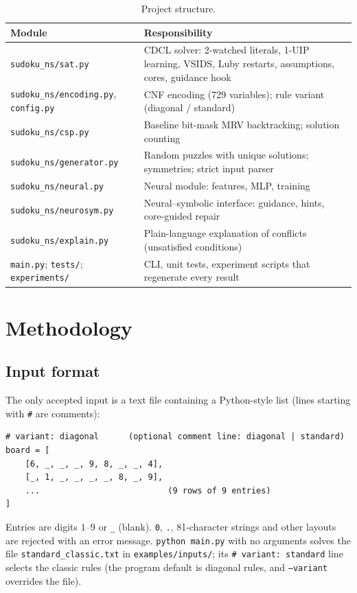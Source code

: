 \documentclass[12pt,a4paper]{article}
\begin{document}
\begin{table}[htbp]\centering\small
\begin{tabular}{@{}L{5.2cm}L{9.5cm}@{}}\toprule
Module & Responsibility\\\midrule
\texttt{sudoku\_ns/sat.py} & CDCL solver: 2-watched literals, 1-UIP learning, VSIDS, Luby restarts, assumptions, cores, guidance hook\\
\texttt{sudoku\_ns/encoding.py}, \texttt{config.py} & CNF encoding (729 variables); rule variant (diagonal / standard)\\
\texttt{sudoku\_ns/csp.py} & Baseline bit-mask MRV backtracking; solution counting\\
\texttt{sudoku\_ns/generator.py} & Random puzzles with unique solutions; symmetries; strict input parser\\
\texttt{sudoku\_ns/neural.py} & Neural module: features, MLP, training\\
\texttt{sudoku\_ns/neurosym.py} & Neural--symbolic interface: guidance, hints, core-guided repair\\
\texttt{sudoku\_ns/explain.py} & Plain-language explanation of conflicts (unsatisfied conditions)\\
\texttt{main.py}; \texttt{tests/}; \texttt{experiments/} & CLI, unit tests, experiment scripts that regenerate every result\\\bottomrule
\end{tabular}
\caption{Project structure.}
\end{table}

\section{Methodology}
\subsection{Input format}
The only accepted input is a text file containing a Python-style list (lines starting with \texttt{\#} are comments):
\begin{lstlisting}
# variant: diagonal      (optional comment line: diagonal | standard)
board = [
    [6, _, _, _, 9, 8, _, _, 4],
    [_, 1, _, _, _, _, 8, _, 9],
    ...                          (9 rows of 9 entries)
]
\end{lstlisting}
Entries are digits $1$--$9$ or \texttt{\_} (blank). \texttt{0}, \texttt{.}, 81-character strings and other layouts are rejected with an error message.
\texttt{python main.py} with no arguments solves the file \texttt{standard\_classic.txt} in \texttt{examples/inputs/}; its \texttt{\# variant: standard} line selects the classic rules
(the program default is diagonal rules, and \texttt{--variant} overrides the file).
\end{document}
